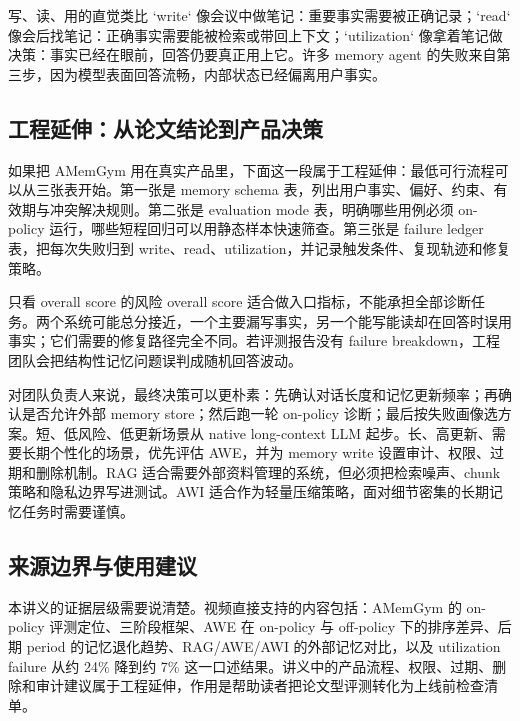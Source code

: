 \begin{knowledgebox}{写、读、用的直觉类比}
`write` 像会议中做笔记：重要事实需要被正确记录；`read` 像会后找笔记：正确事实需要能被检索或带回上下文；`utilization` 像拿着笔记做决策：事实已经在眼前，回答仍要真正用上它。许多 memory agent 的失败来自第三步，因为模型表面回答流畅，内部状态已经偏离用户事实。
\end{knowledgebox}

\subsection{工程延伸：从论文结论到产品决策}

如果把 AMemGym 用在真实产品里，下面这一段属于工程延伸：最低可行流程可以从三张表开始。第一张是 memory schema 表，列出用户事实、偏好、约束、有效期与冲突解决规则。第二张是 evaluation mode 表，明确哪些用例必须 on-policy 运行，哪些短程回归可以用静态样本快速筛查。第三张是 failure ledger 表，把每次失败归到 write、read、utilization，并记录触发条件、复现轨迹和修复策略。

\begin{warningbox}{只看 overall score 的风险}
overall score 适合做入口指标，不能承担全部诊断任务。两个系统可能总分接近，一个主要漏写事实，另一个能写能读却在回答时误用事实；它们需要的修复路径完全不同。若评测报告没有 failure breakdown，工程团队会把结构性记忆问题误判成随机回答波动。
\end{warningbox}

对团队负责人来说，最终决策可以更朴素：先确认对话长度和记忆更新频率；再确认是否允许外部 memory store；然后跑一轮 on-policy 诊断；最后按失败画像选方案。短、低风险、低更新场景从 native long-context LLM 起步。长、高更新、需要长期个性化的场景，优先评估 AWE，并为 memory write 设置审计、权限、过期和删除机制。RAG 适合需要外部资料管理的系统，但必须把检索噪声、chunk 策略和隐私边界写进测试。AWI 适合作为轻量压缩策略，面对细节密集的长期记忆任务时需要谨慎。

\subsection{来源边界与使用建议}

本讲义的证据层级需要说清楚。视频直接支持的内容包括：AMemGym 的 on-policy 评测定位、三阶段框架、AWE 在 on-policy 与 off-policy 下的排序差异、后期 period 的记忆退化趋势、RAG/AWE/AWI 的外部记忆对比，以及 utilization failure 从约 24\% 降到约 7\% 这一口述结果。讲义中的产品流程、权限、过期、删除和审计建议属于工程延伸，作用是帮助读者把论文型评测转化为上线前检查清单。

